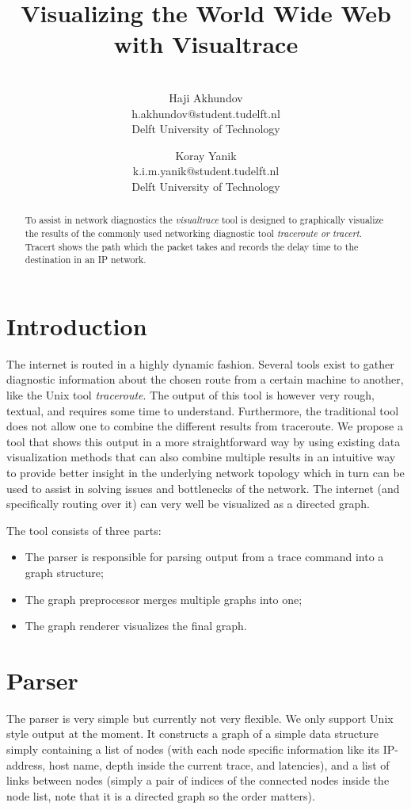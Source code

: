 \documentclass[a4paper,10pt]{article}
\title{Visualizing the World Wide Web with Visualtrace}
\author{\\Haji Akhundov\\h.akhundov@student.tudelft.nl\\ Delft University of Technology \and Koray Yanik\\k.i.m.yanik@student.tudelft.nl\\ Delft University of Technology}
\begin{document}
\maketitle

\begin{abstract}
To assist in network diagnostics the \emph{visualtrace} tool is designed to graphically visualize the results of the commonly used networking diagnostic tool \emph{traceroute} \textit{or} \emph{tracert}. Tracert shows the path which the packet takes and records the delay time to the destination in an IP network.
\end{abstract}

\section{Introduction}
The internet is routed in a highly dynamic fashion. Several tools exist to gather diagnostic information about the chosen route from a certain machine to another, like the Unix tool \emph{traceroute}. The output of this tool is however very rough, textual, and requires some time to understand. Furthermore, the traditional tool does not allow one to combine the different results from traceroute. We propose a tool that shows this output in a more straightforward way by using existing data visualization methods that can also combine multiple results in an intuitive way to provide better insight in the underlying network topology which in turn can be used to assist in solving issues and bottlenecks of the network. The internet (and specifically routing over it) can very well be visualized as a directed graph.

The tool consists of three parts:
\begin{itemize}
\item The parser is responsible for parsing output from a trace command into a graph structure;
\item The graph preprocessor merges multiple graphs into one;
\item The graph renderer visualizes the final graph.
\end{itemize}

\section{Parser}
The parser is very simple but currently not very flexible. We only support Unix style output at the moment. It constructs a graph of a simple data structure simply containing a list of nodes (with each node specific information like its IP-address, host name, depth inside the current trace, and latencies), and a list of links between nodes (simply a pair of indices of the connected nodes inside the node list, note that it is a directed graph so the order matters).
\end{document}
